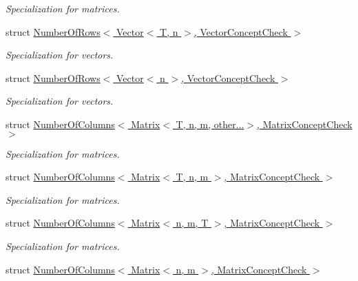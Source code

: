 \begin{DoxyCompactItemize}
\begin{DoxyCompactList}\small\item\em \-Specialization for matrices. \end{DoxyCompactList}\item 
struct \hyperlink{structFunG_1_1LinearAlgebra_1_1NumberOfRows_3_01Vector_3_01T_00_01n_01_4_00_01VectorConceptCheck_01_4}{\-Number\-Of\-Rows$<$ Vector$<$ T, n $>$, Vector\-Concept\-Check $>$}
\begin{DoxyCompactList}\small\item\em \-Specialization for vectors. \end{DoxyCompactList}\item 
struct \hyperlink{structFunG_1_1LinearAlgebra_1_1NumberOfRows_3_01Vector_3_01n_01_4_00_01VectorConceptCheck_01_4}{\-Number\-Of\-Rows$<$ Vector$<$ n $>$, Vector\-Concept\-Check $>$}
\begin{DoxyCompactList}\small\item\em \-Specialization for vectors. \end{DoxyCompactList}\item 
struct \hyperlink{structFunG_1_1LinearAlgebra_1_1NumberOfColumns_3_01Matrix_3_01T_00_01n_00_01m_00_01other_8_8_8_4_00_01MatrixConceptCheck_01_4}{\-Number\-Of\-Columns$<$ Matrix$<$ T, n, m, other...$>$, Matrix\-Concept\-Check $>$}
\begin{DoxyCompactList}\small\item\em \-Specialization for matrices. \end{DoxyCompactList}\item 
struct \hyperlink{structFunG_1_1LinearAlgebra_1_1NumberOfColumns_3_01Matrix_3_01T_00_01n_00_01m_01_4_00_01MatrixConceptCheck_01_4}{\-Number\-Of\-Columns$<$ Matrix$<$ T, n, m $>$, Matrix\-Concept\-Check $>$}
\begin{DoxyCompactList}\small\item\em \-Specialization for matrices. \end{DoxyCompactList}\item 
struct \hyperlink{structFunG_1_1LinearAlgebra_1_1NumberOfColumns_3_01Matrix_3_01n_00_01m_00_01T_01_4_00_01MatrixConceptCheck_01_4}{\-Number\-Of\-Columns$<$ Matrix$<$ n, m, T $>$, Matrix\-Concept\-Check $>$}
\begin{DoxyCompactList}\small\item\em \-Specialization for matrices. \end{DoxyCompactList}\item 
struct \hyperlink{structFunG_1_1LinearAlgebra_1_1NumberOfColumns_3_01Matrix_3_01n_00_01m_01_4_00_01MatrixConceptCheck_01_4}{\-Number\-Of\-Columns$<$ Matrix$<$ n, m $>$, Matrix\-Concept\-Check $>$}

\end{DoxyCompactItemize}
